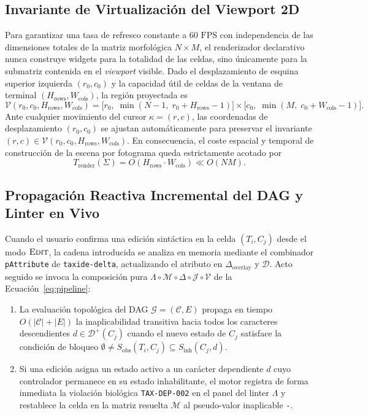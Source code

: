 \documentclass[11pt,a4paper]{article}
\theoremstyle{definition}
\theoremstyle{remark}
\newcommand{\Sobs}{S_{\text{obs}}}
\newcommand{\Sinh}{S_{\text{inh}}}
\begin{document}
\subsection{Invariante de Virtualización del Viewport 2D}
Para garantizar una tasa de refresco constante a $60\text{ FPS}$ con independencia de las dimensiones totales de la matriz morfológica $N \times M$, el renderizador declarativo nunca construye widgets para la totalidad de las celdas, sino únicamente para la submatriz contenida en el \emph{viewport} visible. Dado el desplazamiento de esquina superior izquierda $(r_0, c_0)$ y la capacidad útil de celdas de la ventana de terminal $(H_{\text{rows}}, W_{\text{cols}})$, la región proyectada es
\begin{equation}
\label{eq:viewport}
\mathcal{V}(r_0, c_0, H_{\text{rows}}, W_{\text{cols}}) = \big[r_0,\; \min(N-1,\; r_0 + H_{\text{rows}} - 1)\big] \times \big[c_0,\; \min(M,\; c_0 + W_{\text{cols}} - 1)\big].
\end{equation}
Ante cualquier movimiento del cursor $\kappa = (r, c)$, las coordenadas de desplazamiento $(r_0, c_0)$ se ajustan automáticamente para preservar el invariante $(r, c) \in \mathcal{V}(r_0, c_0, H_{\text{rows}}, W_{\text{cols}})$. En consecuencia, el coste espacial y temporal de construcción de la escena por fotograma queda estrictamente acotado por
\begin{equation}
T_{\text{render}}(\Sigma) = O(H_{\text{rows}} \cdot W_{\text{cols}}) \ll O(NM).
\end{equation}

\subsection{Propagación Reactiva Incremental del DAG y Linter en Vivo}
Cuando el usuario confirma una edición sintáctica en la celda $(T_i, C_j)$ desde el modo $\textsc{Edit}$, la cadena introducida se analiza en memoria mediante el combinador \texttt{pAttribute} de \texttt{taxide-delta}, actualizando el atributo en $\Delta_{\text{overlay}}$ y $\mathcal{D}$. Acto seguido se invoca la composición pura $\Lambda \circ \mathcal{M} \circ \Delta \circ \mathcal{J} \circ \mathcal{V}$ de la Ecuación~\eqref{eq:pipeline}:
\begin{enumerate}
    \item La evaluación topológica del DAG $\mathcal{G} = (\mathcal{C}, E)$ propaga en tiempo $O(|\mathcal{C}| + |E|)$ la inaplicabilidad transitiva hacia todos los caracteres descendientes $d \in \mathcal{D}^+(C_j)$ cuando el nuevo estado de $C_j$ satisface la condición de bloqueo $\emptyset \neq \Sobs(T_i, C_j) \subseteq \Sinh(C_j, d)$.
    \item Si una edición asigna un estado activo a un carácter dependiente $d$ cuyo controlador permanece en su estado inhabilitante, el motor registra de forma inmediata la violación biológica \texttt{TAX-DEP-002} en el panel del linter $\Lambda$ y restablece la celda en la matriz resuelta $\mathcal{M}$ al pseudo-valor inaplicable \texttt{-}.
\end{enumerate}
\end{document}
